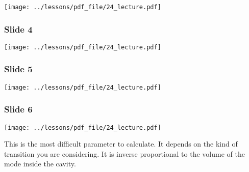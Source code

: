 \documentclass[../main/main.tex]{subfiles}
\begin{document}
\begin{minipage}[]{0.5\linewidth}
\centering
\texttt{[image: ../lessons/pdf\_file/24\_lecture.pdf]}
\end{minipage}
\hspace{0.3cm}\vspace{0.3cm}
\begin{minipage}[c]{0.47\linewidth}

\end{minipage}

\newpage

\subsubsection*{Slide 4}

\begin{minipage}[]{0.5\linewidth}
\centering
\texttt{[image: ../lessons/pdf\_file/24\_lecture.pdf]}
\end{minipage}
\hspace{0.3cm}\vspace{0.3cm}
\begin{minipage}[c]{0.47\linewidth}

\end{minipage}

\subsubsection*{Slide 5}

\begin{minipage}[]{0.5\linewidth}
\centering
\texttt{[image: ../lessons/pdf\_file/24\_lecture.pdf]}
\end{minipage}
\hspace{0.3cm}\vspace{0.3cm}
\begin{minipage}[c]{0.47\linewidth}

\end{minipage}

\subsubsection*{Slide 6}

\begin{minipage}[]{0.5\linewidth}
\centering
\texttt{[image: ../lessons/pdf\_file/24\_lecture.pdf]}
\end{minipage}
\hspace{0.3cm}\vspace{0.3cm}
\begin{minipage}[c]{0.47\linewidth}

This is the most difficult parameter to calculate. It depends on the kind of transition you are considering. It is inverse proportional to the volume of the mode inside the cavity.

\end{minipage}
\end{document}
